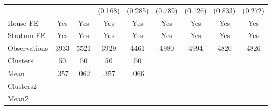 {\begin{tabular}{l*{8}{c}}
                &                  &                  &  (0.168)         &  (0.285)         &  (0.789)         &  (0.126)         &  (0.833)         &  (0.272)         \\
House FE        &      Yes         &      Yes         &      Yes         &      Yes         &      Yes         &      Yes         &      Yes         &      Yes         \\
Stratum FE      &      Yes         &      Yes         &      Yes         &      Yes         &      Yes         &      Yes         &      Yes         &      Yes         \\
\midrule
Observations    &     3933         &     5521         &     3929         &     4461         &     4980         &     4994         &     4820         &     4826         \\
Clusters        &       50         &       50         &       50         &       50         &                  &                  &                  &                  \\
Mean            &     .357         &     .062         &     .357         &     .066         &                  &                  &                  &                  \\
Clusters2       &                  &                  &                  &                  &                  &                  &                  &                  \\
Mean2           &                  &                  &                  &                  &                  &                  &                  &                  \\
\bottomrule
\end{tabular}
}
